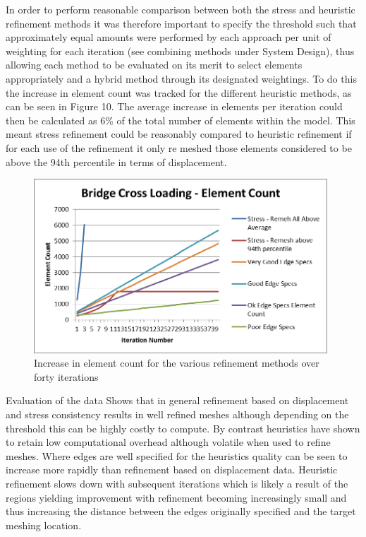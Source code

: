 \noindent
In order to perform reasonable comparison between both the stress and heuristic refinement methods it was therefore important to specify the threshold such that approximately equal amounts were performed by each approach per unit of weighting for each iteration (see combining methods under System Design), thus allowing each method to be evaluated on its merit to select elements appropriately and a hybrid method through its designated weightings. To do this the increase in element count was tracked for the different heuristic methods, as can be seen in Figure 10. The average increase in elements per iteration could then be calculated as 6\% of the total number of elements within the model. This meant stress refinement could be reasonably compared to heuristic refinement if for each use of the refinement it only re meshed those elements considered to be above the 94th percentile in terms of displacement. \\ 


\begin{figure}[!h]
  \centerline{\includegraphics[width=110mm, scale=1]{../Graphics/Graphs/BridgeCrossLoadingElementCount.png}}
  \caption{Increase in element count for the various refinement methods over forty iterations}
  \label{fig:sub1}
\end{figure}

\noindent
Evaluation of the data Shows that in general refinement based on displacement and stress consistency results in well refined meshes although depending on the threshold this can be highly costly to compute. By contrast heuristics have shown to retain low computational overhead although volatile when used to refine meshes. Where edges are well specified for the heuristics quality can be seen to increase more rapidly than refinement based on displacement data. Heuristic refinement slows down with subsequent iterations which is likely a result of the regions yielding improvement with refinement becoming increasingly small and thus increasing the distance between the edges originally specified and the target meshing location. \\

